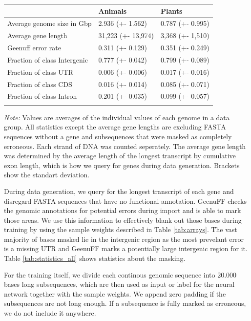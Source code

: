 \documentclass{bioinfo}
\begin{document}
\begin{methods}
\begin{table}[!t]
 {
\begin{tabular}{@{}lll@{}}
\toprule & Animals & Plants\\
\midrule
Average genome size in Gbp& 2.936 (+- 1.562) & 0.787 (+- 0.995) \\
Average gene length & 31,223 (+- 13,974)& 3,368 (+- 1,510)\\
Geenuff error rate & 0.311 (+- 0.129) & 0.351 (+- 0.249) \\
Fraction of class Intergenic  & 0.777 (+- 0.042) & 0.799 (+- 0.089) \\
Fraction of class UTR & 0.006 (+- 0.006) & 0.017 (+- 0.016) \\
Fraction of class CDS & 0.016 (+- 0.014) & 0.085 (+- 0.071) \\
Fraction of class Intron & 0.201 (+- 0.035) & 0.099 (+- 0.057) \\
\botrule
\end{tabular}}{{\it Note:} Values are averages of the individual values of each genome in a data group. All statistics except the average gene lengths are excluding FASTA sequences without a gene and subsequences that were masked as completely erroneous. Each strand of DNA was counted seperately. The average gene length was determined by the average length of the longest transcript by cumulative exon length, which is how we query for genes during data generation. Brackets show the standart deviation.}
\end{table}

During data generation, we query for the longest transcript of each gene and disregard FASTA sequences that have no functional annotation. GeenuFF checks the genomic annotations for potential errors during import and is able to mark those areas. We use this information to effectively blank out those bases during training by using the sample weights described in Table \ref{tab:arrays}. The vast majority of bases masked lie in the intergenic region as the most prevelant error is a missing UTR and GeenuFF marks a potentially large intergenic region for it. Table \ref{tab:statistics_all} shows statistics about the masking. 

For the training itself, we divide each continous genomic sequence into 20.000 bases long subsequences, which are then used as input or label for the neural network together with the sample weights. We append zero padding if the subsequences are not long enough. If a subsequence is fully marked as erroneous, we do not include it anywhere.


\end{methods}
\end{document}
